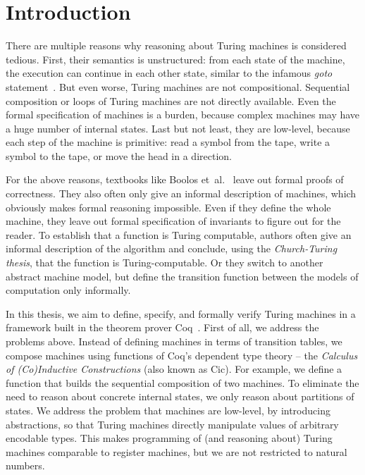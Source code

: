 \chapter{Introduction}
\label{chap:intro}


There are multiple reasons why reasoning about Turing machines is considered tedious.  First, their semantics is unstructured: from each state of the
machine, the execution can continue in each other state, similar to the infamous \textit{goto} statement~\cite{dijkstra2002go}.  But even worse,
Turing machines are not compositional.  Sequential composition or loops of Turing machines are not directly available.  Even the formal specification
of machines is a burden, because complex machines may have a huge number of internal states.  Last but not least, they are low-level, because each
step of the machine is primitive: read a symbol from the tape, write a symbol to the tape, or move the head in a direction.

For the above reasons, textbooks like Boolos et~al.~\cite{boolos2007computability} leave out formal proofs of correctness.  They also often only give
an informal description of machines, which obviously makes formal reasoning impossible.  Even if they define the whole machine, they leave out formal
specification of invariants to figure out for the reader.  To establish that a function is Turing computable, authors often give an informal
description of the algorithm and conclude, using the \textit{Church-Turing thesis}, that the function is Turing-computable. Or they switch to another
abstract machine model, but define the transition function between the models of computation only informally.

In this thesis, we aim to define, specify, and formally verify Turing machines in a framework built in the theorem prover Coq~\cite{Coq}.  First of
all, we address the problems above.  Instead of defining machines in terms of transition tables, we compose machines using functions of Coq's
dependent type theory -- the \textit{Calculus of (Co)Inductive Constructions} (also known as Cic).  For example, we define a function that builds the
sequential composition of two machines.  To eliminate the need to reason about concrete internal states, we only reason about partitions of states.
We address the problem that machines are low-level, by introducing abstractions, so that Turing machines directly manipulate values of arbitrary
encodable types.  This makes programming of (and reasoning about) Turing machines comparable to register machines, but we are not restricted to
natural numbers.

